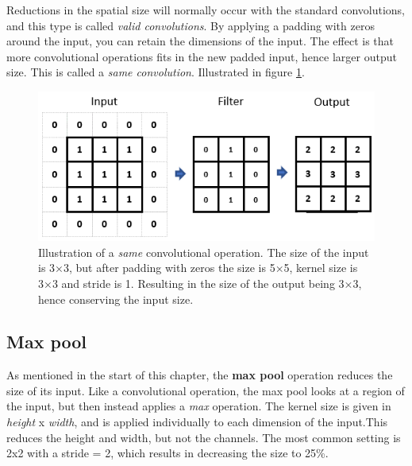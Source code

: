     
    Reductions in the spatial size\cite{o2015introduction_convolutions} will normally occur with the standard convolutions, and this type is called \textit{valid convolutions}. By applying a padding with zeros around the input, you can retain the dimensions of the input. The effect is that more convolutional operations fits in the new padded input, hence larger output size. This is called a \textit{same convolution}. Illustrated in figure \ref{same_convolutional_fig}.
    
    \begin{figure}[H]
        \centering
        \includegraphics[scale=0.5]{figures/same_convolutions.png}
        \caption[Same convolution example]{Illustration of a \textit{same} convolutional operation. The size of the input is 3×3, but after padding with zeros the size is 5×5, kernel size is 3×3 and stride is 1. Resulting in the size of the output being 3×3, hence conserving the input size.}
      	\medskip 
        \label{same_convolutional_fig}
    \end{figure}
    
    
    
\subsection{Max pool}
    As mentioned in the start of this chapter, the \textbf{max pool} operation reduces the size of its input\cite{o2015introduction_convolutions}. Like a convolutional operation, the max pool looks at a region of the input, but then instead applies a \textit{max} operation. The kernel size is given in \textit{height} x \textit{width}, and is applied individually to each dimension of the input.This reduces the height and width, but not the channels. The most common setting is 2x2 with a stride = 2, which results in decreasing the size to 25\%.

